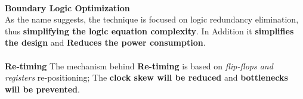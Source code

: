 \paragraph{}
{\textbf{Boundary Logic Optimization}} \\
As the name suggests, the technique is focused on logic redundancy elimination, thus \textbf{simplifying the logic equation complexity}. In Addition it \textbf{simplifies the design} and \textbf{Reduces the power consumption}.
\paragraph{}
\textbf{Re-timing} \linebreak
The mechanism behind \textbf{Re-timing} is based on \textit{flip-flops and registers} re-positioning; The \textbf{clock skew will be reduced} and \textbf{bottlenecks will be prevented}.